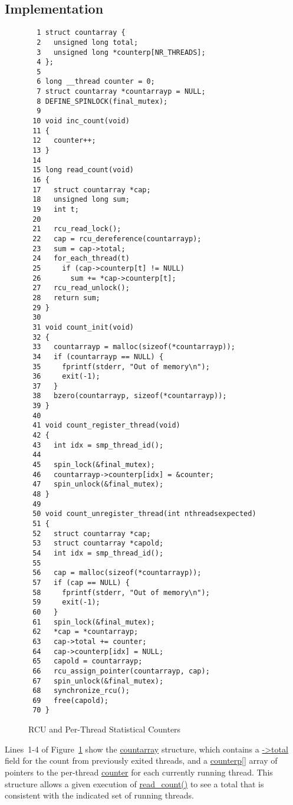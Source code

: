 \subsection{Implementation}

\begin{figure}[bp]
{ \scriptsize
\begin{verbatim}
  1 struct countarray {
  2   unsigned long total;
  3   unsigned long *counterp[NR_THREADS];
  4 };
  5 
  6 long __thread counter = 0;
  7 struct countarray *countarrayp = NULL;
  8 DEFINE_SPINLOCK(final_mutex);
  9 
 10 void inc_count(void)
 11 {
 12   counter++;
 13 }
 14 
 15 long read_count(void)
 16 {
 17   struct countarray *cap;
 18   unsigned long sum;
 19   int t;
 20 
 21   rcu_read_lock();
 22   cap = rcu_dereference(countarrayp);
 23   sum = cap->total;
 24   for_each_thread(t)
 25     if (cap->counterp[t] != NULL)
 26       sum += *cap->counterp[t];
 27   rcu_read_unlock();
 28   return sum;
 29 }
 30 
 31 void count_init(void)
 32 {
 33   countarrayp = malloc(sizeof(*countarrayp));
 34   if (countarrayp == NULL) {
 35     fprintf(stderr, "Out of memory\n");
 36     exit(-1);
 37   }
 38   bzero(countarrayp, sizeof(*countarrayp));
 39 }
 40 
 41 void count_register_thread(void)
 42 {
 43   int idx = smp_thread_id();
 44 
 45   spin_lock(&final_mutex);
 46   countarrayp->counterp[idx] = &counter;
 47   spin_unlock(&final_mutex);
 48 }
 49 
 50 void count_unregister_thread(int nthreadsexpected)
 51 {
 52   struct countarray *cap;
 53   struct countarray *capold;
 54   int idx = smp_thread_id();
 55 
 56   cap = malloc(sizeof(*countarrayp));
 57   if (cap == NULL) {
 58     fprintf(stderr, "Out of memory\n");
 59     exit(-1);
 60   }
 61   spin_lock(&final_mutex);
 62   *cap = *countarrayp;
 63   cap->total += counter;
 64   cap->counterp[idx] = NULL;
 65   capold = countarrayp;
 66   rcu_assign_pointer(countarrayp, cap);
 67   spin_unlock(&final_mutex);
 68   synchronize_rcu();
 69   free(capold);
 70 }
\end{verbatim}
}
\caption{RCU and Per-Thread Statistical Counters}
\label{fig:applyrcu:RCU and Per-Thread Statistical Counters}
\end{figure}

Lines~1-4 of
Figure~\ref{fig:applyrcu:RCU and Per-Thread Statistical Counters}
show the \url{countarray} structure, which contains a
\url{->total} field for the count from previously exited threads,
and a \url{counterp[]} array of pointers to the per-thread
\url{counter} for each currently running thread.
This structure allows a given execution of \url{read_count()}
to see a total that is consistent with the indicated set of running
threads.

